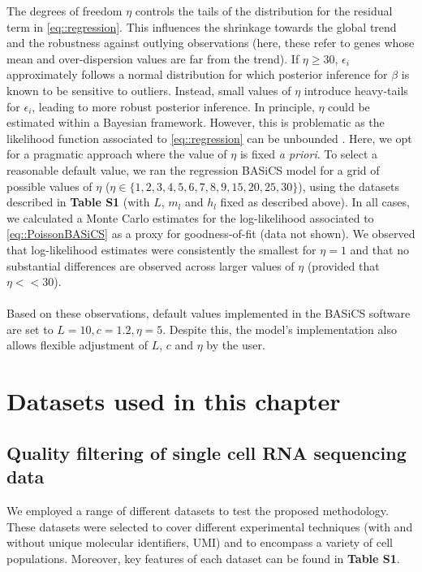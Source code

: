 The degrees of freedom $\eta$ controls the tails of the distribution for the residual term in \ref{eq::regression}. This influences the shrinkage towards the global trend and the robustness against outlying observations (here, these refer to genes whose mean and over-dispersion values are far from the trend).  If $\eta \geq 30$, $\epsilon_i$ approximately follows a normal distribution for which posterior inference for $\beta$ is known to be sensitive to outliers. Instead, small values of $\eta$ introduce heavy-tails for $\epsilon_i$, leading to more robust posterior inference. In principle, $\eta$ could be estimated within a Bayesian framework. However, this is problematic as the likelihood function associated to \ref{eq::regression} can be unbounded \citep{Fernandez1999}. Here, we opt for a pragmatic approach where the value of $\eta$ is fixed \emph{a priori}. To select a reasonable default value, we ran the regression BASiCS model for a grid of possible values of $\eta$ ($\eta \in \{ 1,2,3,4,5,6,7,8,9,15,20,25,30 \}$), using the datasets described in \textbf{Table S1} (with $L$, $m_l$ and $h_l$ fixed as described above). In all cases, we calculated a Monte Carlo estimates for the log-likelihood associated to \ref{eq::PoissonBASiCS} as a proxy for goodness-of-fit (data not shown). We observed that log-likelihood estimates were consistently the smallest for $\eta=1$ and that no substantial differences are observed across larger values of $\eta$ (provided that $\eta << 30$). \\ 

 \\

Based on these observations, default values implemented in the BASiCS software are set to $L=10, c=1.2, \eta=5$. Despite this, the model's implementation also allows flexible adjustment of $L$, $c$ and $\eta$ by the user. 

\section{Datasets used in this chapter} \label{sec2:datasets}

\subsection*{Quality filtering of single cell RNA sequencing data}
We employed a range of different datasets to test the proposed methodology. These datasets were selected to cover different experimental techniques (with and without unique molecular identifiers, UMI) and to encompass a variety of cell populations. Moreover, key features of each dataset can be found in \textbf{Table S1}. 

